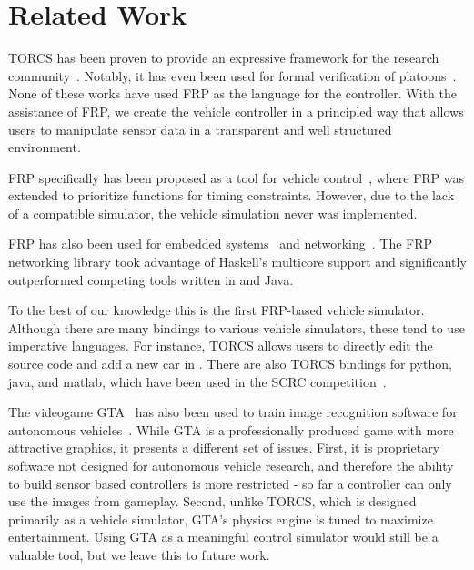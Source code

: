 \section{Related Work}

TORCS has been proven to provide an expressive framework for the research community~\cite{OnievaPAMP09,conf/cig/CardamoneLL09,conf/cig/MunozGS10}. 
Notably, it has even been used for formal verification of platoons~\cite{kamali2016formal,xu2016experimental}. 
None of these works have used FRP as the language for the controller.
With the assistance of FRP, we create the  vehicle controller in a principled way that allows users to manipulate sensor data in a transparent and well structured environment.

FRP specifically has been proposed as a tool for vehicle control~\cite{kazemi2016,zou2016}, where FRP was extended to prioritize functions for timing constraints. However, due to the lack of a compatible simulator, the vehicle simulation never was implemented. 

FRP has also been used for embedded systems~\cite{helbling2016juniper} and networking~\cite{voellmy2012scalable}.
The FRP networking library took advantage of Haskell's multicore support and significantly outperformed competing tools written in \CC and Java.

To the best of our knowledge this is the first FRP-based vehicle simulator.
Although there are many bindings to various vehicle simulators, these tend to use imperative languages.
For instance, TORCS allows users to directly edit the source code and add a new car in \CC.
There are also TORCS bindings for python, java, and matlab, which have been used in the SCRC competition~\cite{SCRC}.

The videogame GTA~\cite{gtaV} has also been used to train image recognition software for autonomous vehicles~\cite{gtaPrinceton}.
While GTA is a professionally produced game with more attractive graphics, it presents a different set of issues.
First, it is proprietary software not designed for autonomous vehicle research, and therefore the ability to build sensor based controllers is more restricted - so far a controller can only use the images from gameplay. 
Second, unlike TORCS, which is designed primarily as a vehicle simulator, GTA's physics engine is tuned to maximize entertainment.
Using GTA as a meaningful control simulator would still be a valuable tool, but we leave this to future work.
